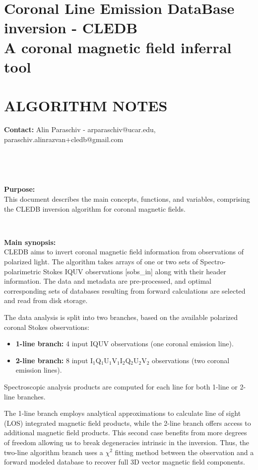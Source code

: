 \documentclass{article}
\begin{document}
\section*{Coronal Line Emission DataBase inversion - CLEDB \\ A coronal magnetic field inferral tool \\~\\ ALGORITHM NOTES}

\textbf{Contact:} Alin Paraschiv - arparaschiv@ucar.edu, paraschiv.alinrazvan+cledb@gmail.com

~

~

\textbf{Purpose:\\} 
This document describes the main concepts, functions, and variables, comprising the CLEDB inversion algorithm for coronal magnetic fields.

~

\textbf{Main synopsis:\\} 
CLEDB aims to invert coronal magnetic field information from observations of polarized light. The algorithm takes arrays of one or two sets of Spectro-polarimetric Stokes IQUV observations [sobs\_in] along with their header information. The data and metadata are pre-processed, and optimal corresponding sets of databases resulting from forward calculations are selected and read from disk storage. 

The data analysis is split into two branches, based on the available polarized coronal Stokes observations: 
\begin{itemize}
\item \textbf{1-line branch:} 4 input IQUV observations (one coronal emission line).
\item \textbf{2-line branch:} 8 input I$_1$Q$_1$U$_1$V$_1$I$_2$Q$_2$U$_2$V$_2$ observations (two coronal emission lines).
\end{itemize} 

Spectroscopic analysis products are computed for each line for both 1-line or 2-line branches.

The 1-line branch employs analytical approximations to calculate line of sight (LOS) integrated magnetic field products, while the 2-line branch offers access to additional magnetic field products. This second case benefits from more degrees of freedom allowing us to break degeneracies intrinsic in the inversion. Thus, the two-line algorithm branch uses a $\chi^2$ fitting method between the observation and a forward modeled database to recover full 3D vector magnetic field components.  
\end{document}
